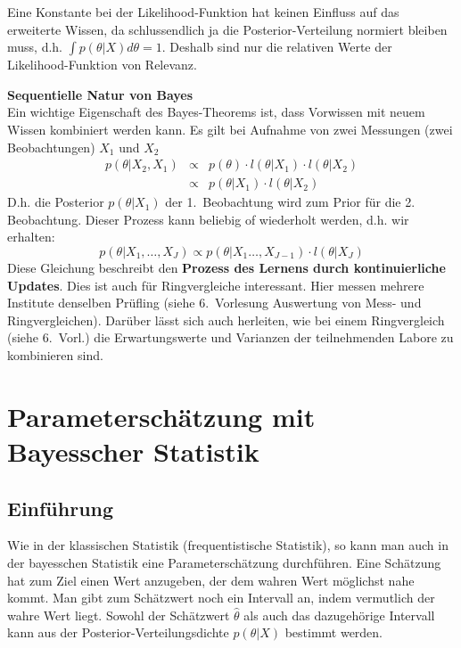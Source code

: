 Eine Konstante  bei der Likelihood-Funktion hat keinen Einfluss auf das erweiterte 
Wissen, da schlussendlich ja die Posterior-Verteilung normiert bleiben muss, d.h.
$\int p(\theta|X) d\theta =1$. Deshalb sind nur die relativen Werte der Likelihood-Funktion von Relevanz. 

\textbf{Sequentielle Natur von Bayes} \\
Ein wichtige Eigenschaft des Bayes-Theorems ist, dass Vorwissen mit
neuem Wissen kombiniert werden kann. Es gilt bei Aufnahme von zwei
Messungen (zwei Beobachtungen) $X_1$ und $X_2$
\[
\begin{array}{rcl}
p(\theta|X_2,X_1) &\propto& p(\theta) \cdot l(\theta|X_1) \cdot l(\theta | X_2) \\
&\propto& p(\theta|X_1) \cdot l(\theta|X_2)
\end{array}
\]
D.h. die Posterior $p(\theta|X_1)$ der 1.~Beobachtung wird zum Prior für die 
2. Beobachtung. Dieser Prozess kann beliebig of wiederholt werden, d.h. wir
erhalten: 
\begin{equation}
p(\theta |X_1,\hdots,X_J) \propto p(\theta | X_1\hdots, X_{J-1}) \cdot l(\theta | X_J) 
\label{eq:Bayes_sequentiell}
\end{equation}
Diese Gleichung beschreibt den \textbf{Prozess des Lernens durch kontinuierliche Updates}. Dies ist auch für Ringvergleiche interessant. Hier messen mehrere 
Institute denselben Prüfling (siehe 6.~Vorlesung \glqq Auswertung von Mess- und Ringvergleichen\grqq). Darüber lässt sich auch herleiten, wie bei einem Ringvergleich (siehe 6.~Vorl.) die Erwartungswerte und Varianzen der teilnehmenden Labore zu kombinieren sind.

\section{Parameterschätzung mit Bayesscher Statistik}
\subsection{Einführung}
Wie in der klassischen Statistik (frequentistische Statistik), so kann man auch in der bayes\-schen Statistik eine Parameterschätzung durchführen. Eine Schätzung hat zum Ziel einen Wert anzugeben, der dem wahren Wert möglichst nahe kommt. Man gibt zum Schätzwert noch ein Intervall  an, indem vermutlich der wahre Wert liegt. Sowohl der Schätzwert $\hat{\theta}$ als auch das dazugehörige Intervall kann aus der Posterior-Ver\-teilungs\-dichte $p(\theta|X)$ bestimmt werden. 
